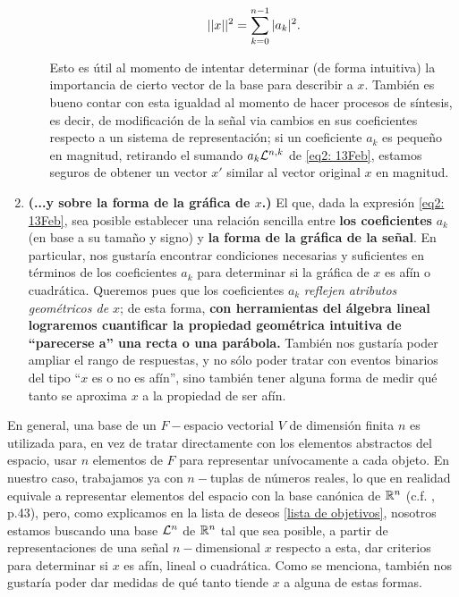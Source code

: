 \begin{listaObj}
\begin{enumerate}
\begin{itemize}
\[
||x||^{2}= \sum\limits_{k=0}^{n-1}|a_{k}|^{2}.
\]

Esto es útil al momento
de intentar determinar
(de forma intuitiva) 
la importancia 
de cierto vector de la base para describir a $x$.
También es bueno contar con esta igualdad
al momento de hacer procesos de síntesis,
es decir, de modificación de la señal
via cambios en sus coeficientes respecto
a un sistema de representación; si un coeficiente
$a_{k}$ es pequeño en magnitud, retirando el sumando
$a_{k} \mathcal{L}^{n,k}$ de \eqref{eq2: 13Feb}, 
estamos seguros de obtener
un vector $x'$ similar al vector original $x$
en magnitud.
\end{itemize}
\item \textbf{
\textcolor{ameMorado}{(...y sobre la forma de la
gráfica de $x$.)}} El que,
dada la expresión \eqref{eq2: 13Feb},
sea posible establecer
una relación sencilla entre \textbf{los coeficientes }
$a_{k}$
(en base a su tamaño y signo) y
\textbf{la forma de la gráfica de la señal}.
En particular, nos gustaría encontrar condiciones
necesarias y suficientes 
en términos de los coeficientes $a_{k}$ para determinar
si la gráfica de $x$ es afín o cuadrática.
Queremos pues que los coeficientes $a_{k}$
\textit{reflejen atributos geométricos de $x$};
de esta forma, 
\textbf{con herramientas del álgebra lineal lograremos cuantificar
la propiedad geométrica intuitiva de ``parecerse a''
una recta o una parábola.} También nos gustaría poder ampliar
el rango de respuestas, y no sólo poder tratar con eventos
binarios del tipo ``$x$ es o no es afín'', sino
también tener alguna forma de medir qué tanto se aproxima
$x$ a la propiedad de ser afín.
\end{enumerate} 

\end{listaObj}


En general, una base de un 
$F-$espacio vectorial $V$ de dimensión finita $n$
es utilizada para, en vez de tratar 
directamente con los elementos abstractos
del espacio, usar $n$ elementos de $F$
para representar unívocamente a cada objeto. En nuestro caso,
trabajamos ya con $n-$tuplas de números reales,
lo que en realidad equivale a representar elementos
del espacio con la base canónica de $\mathbb{R}^{n}$
(c.f. \cite{friedberg}, p.43), pero,
como explicamos en la lista de deseos
\ref{lista de objetivos},
nosotros estamos buscando una base $\mathcal{L}^{n}$ 
de $\mathbb{R}^{n}$ tal que
sea posible, a partir de representaciones
de una señal $n-$dimensional $x$
respecto a esta, dar
criterios para determinar si $x$ es afín, lineal o cuadrática.
Como se menciona, también nos gustaría poder dar medidas
de qué tanto tiende $x$ a alguna de estas formas.



